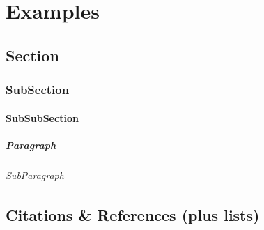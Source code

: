 \chapter{Examples}\label{chap:chap}


\section{Section}\label{sec:sec}
\subsection{SubSection}\label{subsec:subsec}
\subsubsection{SubSubSection}\label{subsubsec:subsubsec}
\paragraph{Paragraph}\label{par:par}
\subparagraph{SubParagraph}\label{subpar:subpar}


\section{Citations \& References (plus lists)}

